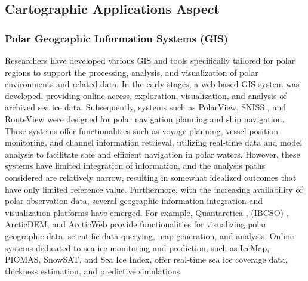 
\subsection{Cartographic Applications Aspect} 

\subsubsection{Polar Geographic Information Systems (GIS)} 
Researchers have developed various GIS and tools specifically tailored for polar regions to support the processing, analysis, and visualization of polar environments and related data. In the early stages, a web-based GIS system \cite{193li2011web} was developed, providing online access, exploration, visualization, and analysis of archived sea ice data. Subsequently, systems such as PolarView, SNISS \cite{168wu2022ship}, and RouteView \cite{169wu2022routeview} were designed for polar navigation planning and ship navigation. These systems offer functionalities such as voyage planning, vessel position monitoring, and channel information retrieval, utilizing real-time data and model analysis to facilitate safe and efficient navigation in polar waters. However, these systems have limited integration of information, and the analysis paths considered are relatively narrow, resulting in somewhat idealized outcomes that have only limited reference value. Furthermore, with the increasing availability of polar observation data, several geographic information integration and visualization platforms have emerged. For example, Quantarctica 
\cite{190matsuoka2021quantarctica}, (IBCSO) \cite{194dorschel2022international}, ArcticDEM, and ArcticWeb provide functionalities for visualizing polar geographic data, scientific data querying, map generation, and analysis. Online systems dedicated to sea ice monitoring and prediction, such as IceMap, PIOMAS, SnowSAT, and Sea Ice Index, offer real-time sea ice coverage data, thickness estimation, and predictive simulations.

